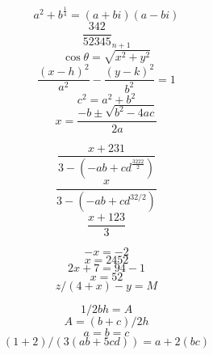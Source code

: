 \documentclass{article}
\begin{document}
\[ a^2+b^{\frac{1}{4}} = (a+bi)(a-bi) \]
\[ \frac{342}{52345}_{n+1} \]
\[ \cos\theta = \sqrt{x^2 + y^2} \]
\[ \frac{(x-h)^2}{a^2} - \frac{(y-k)^2}{b^2} = 1 \]
\[ c^2 = a^2 + b^2 \]
\[ x = \frac{-b\pm\sqrt{b^2-4ac}}{2a} \]

\[ \frac{x+231}{3-(-ab + cd^\frac{3222}{2})} \]
\[ \frac{x}{3-(-ab + cd^{32/2})} \]
\[ \frac{x+123}{3}  \]

\[ -x = -2 \]
\[ x=2452 \] 
\[ 2x + 7 = 94 - 1 \] 
\[ x = 52 \] 
\[ z/(4 + x) - y = M \]

\[ 1/2bh = A \]
\[ A = (b+c)/2h \]
\[ a=b=c \]
\[ (1+2)/(3(ab+5cd))=a+2(bc) \]
\end{document}
